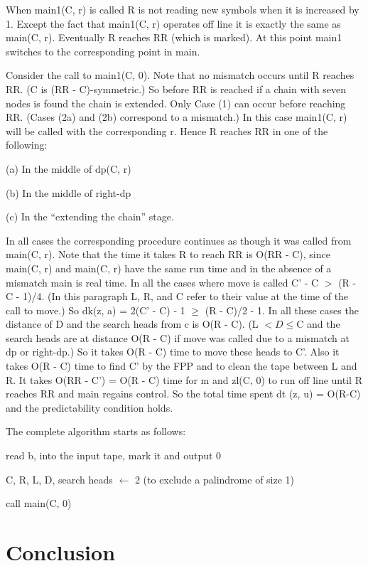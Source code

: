 \documentclass[11pt,a4paper]{report}
\begin{document}
When main1(C, r) is called R is not reading new symbols when it is increased by 1.
Except the fact that main1(C, r) operates off line it is exactly the same as main(C, r).
Eventually R reaches RR (which is marked). At this point main1 switches to the corresponding point in main. 

Consider the call to main1(C, 0). Note that no mismatch occurs until R reaches RR.
(C is (RR - C)-symmetric.) So before RR is reached if a chain with seven nodes is found
the chain is extended. Only Case (1) can occur before reaching RR. (Cases (2a) and (2b)
correspond to a mismatch.) In this case main1(C, r) will be called with the corresponding r.
Hence R reaches RR in one of the following:

(a) In the middle of dp(C, r)

(b) In the middle of right-dp

(c) In the “extending the chain” stage.

In all cases the corresponding procedure continues as though it was called from
main(C, r). Note that the time it takes R to reach RR is O(RR - C), since main(C, r)
and main(C, r) have the same run time and in the absence of a mismatch main is real time.
In all the cases where move is called C’ - C $>$ (R - C - 1)/4. (In this paragraph L,
R, and C refer to their value at the time of the call to move.) So dk(z, a) = 2(C’ - C) -
1 $\geq$ (R - C)/2 - 1. In all these cases the distance of D and the search heads from c is
O(R - C). (L $< D \leq $C and the search heads are at distance O(R - C) if move was
called due to a mismatch at dp or right-dp.) So it takes O(R - C) time to move these
heads to C’. Also it takes O(R - C) time to find C’ by the FPP and to clean the tape
between L and R. It takes O(RR - C’) = O(R - C) time for m and zl(C, 0) to run off line
until R reaches RR and main regains control. So the total time spent dt (z, u) = O(R-C)
and the predictability condition holds.

The complete algorithm starts as follows:
\begin{myindentpar}{2em}

read b, into the input tape, mark it and output 0

C, R, L, D, search heads $\leftarrow$ 2 (to exclude a palindrome of size 1)

call main(C, 0)
\end{myindentpar}

\chapter{Conclusion}
\end{document}
